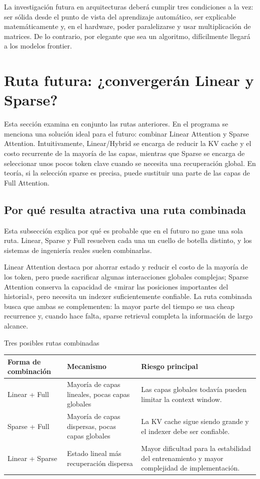 \documentclass[a4paper]{article}
\begin{document}
La investigación futura en arquitecturas deberá cumplir tres condiciones a la vez: ser sólida desde el punto de vista del aprendizaje automático, ser explicable matemáticamente y, en el hardware, poder paralelizarse y usar multiplicación de matrices. De lo contrario, por elegante que sea un algoritmo, difícilmente llegará a los modelos frontier.
\section{Ruta futura: ¿convergerán Linear y Sparse?}

Esta sección examina en conjunto las rutas anteriores. En el programa se menciona una solución ideal para el futuro: combinar Linear Attention y Sparse Attention. Intuitivamente, Linear/Hybrid se encarga de reducir la KV cache y el costo recurrente de la mayoría de las capas, mientras que Sparse se encarga de seleccionar unos pocos token clave cuando se necesita una recuperación global. En teoría, si la selección sparse es precisa, puede sustituir una parte de las capas de Full Attention.

\subsection{Por qué resulta atractiva una ruta combinada}

Esta subsección explica por qué es probable que en el futuro no gane una sola ruta. Linear, Sparse y Full resuelven cada una un cuello de botella distinto, y los sistemas de ingeniería reales suelen combinarlas.

Linear Attention destaca por ahorrar estado y reducir el costo de la mayoría de los token, pero puede sacrificar algunas interacciones globales complejas; Sparse Attention conserva la capacidad de «mirar las posiciones importantes del historial», pero necesita un indexer suficientemente confiable. La ruta combinada busca que ambas se complementen: la mayor parte del tiempo se usa cheap recurrence y, cuando hace falta, sparse retrieval completa la información de largo alcance.

\begin{knowledgebox}{Tres posibles rutas combinadas}
\begin{tabularx}{\textwidth}{p{}p{}X}
\toprule
Forma de combinación & Mecanismo & Riesgo principal \\
\midrule
Linear + Full & Mayoría de capas lineales, pocas capas globales & Las capas globales todavía pueden limitar la context window. \\
Sparse + Full & Mayoría de capas dispersas, pocas capas globales & La KV cache sigue siendo grande y el indexer debe ser confiable. \\
Linear + Sparse & Estado lineal más recuperación dispersa & Mayor dificultad para la estabilidad del entrenamiento y mayor complejidad de implementación. \\
\bottomrule
\end{tabularx}
\end{knowledgebox}
\end{document}
